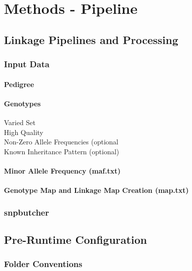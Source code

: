 \chapter{Methods - Pipeline}

\section{Linkage Pipelines and Processing}

\subsection{Input Data}
\subsubsection{Pedigree}
\subsubsection{Genotypes}
\begin{description}
\item[Varied Set]{}
\item[High Quality]{}
\item[Non-Zero Allele Frequencies (optional]{}
\item[Known Inheritance Pattern (optional)]{}
\end{description}

\subsubsection{Minor Allele Frequency (maf.txt)}

\subsubsection{Genotype Map and Linkage Map Creation (map.txt)}

\subsection{snpbutcher}


\section{Pre-Runtime Configuration}
\subsection{Folder Conventions}

